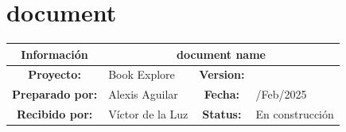\documentclass[12pt,a4paper]{article}
\begin{document}
\section*{document}
\begin{center} 
    \begin{tabular}{|c|l|c|l|}
        \hline
        \textbf{Información} & \multicolumn{3}{|c|}{document name} \\
        \hline
        \textbf{Proyecto:} & Book Explore & \textbf{Version:} &  \\    
        \hline
        \textbf{Preparado por:} & Alexis Aguilar & \textbf{Fecha:} & /Feb/2025 \\    
        \hline
        \textbf{Recibido por:} & Víctor de la Luz & \textbf{Status:} & En construcción \\    
        \hline
    \end{tabular}
\end{center}
\end{document}
